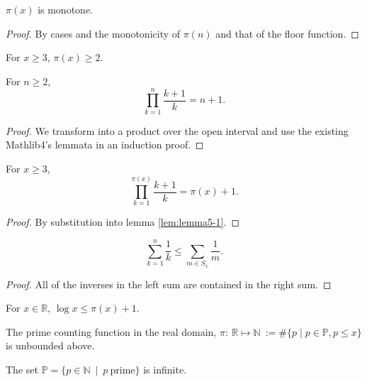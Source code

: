 \begin{lemma}
\label{lem:lemma5-2-1}
\leanok
$\pi(x)$ is monotone.
\end{lemma}
\begin{proof}
\leanok
By cases and the monotonicity of $\pi(n)$ and that of the floor function.
\end{proof}

\begin{lemma}
\label{lem:lemma5-2}
\leanok
For $x\ge3$, $\pi(x)\ge2$.
\end{lemma}

\begin{lemma}
\label{lem:lemma5-1}
\leanok
For $n\ge2$,
    $$\prod_{k=1}^{n}\frac{k+1}{k} = n+1.$$
\end{lemma}
\begin{proof}
\leanok
We transform into a product over the open interval and use the existing Mathlib4's lemmata in an induction proof.
\end{proof}

\begin{lemma}
\label{lem:lemma5}
\leanok
For $x\ge3$,
    $$\prod_{k=1}^{\pi(x)}\frac{k+1}{k} = \pi(x)+1.$$
\end{lemma}
\begin{proof}
\leanok
    By substitution into lemma \ref{lem:lemma5-1}.
\end{proof}


\begin{lemma}
\label{lem:lemma1}
\leanok
{}
    $$\sum_{k=1}^n\frac1k \le \sum_{m\in S_x}\frac{1}{m}. $$
\end{lemma}
\begin{proof}
All of the inverses in the left sum are contained in the right sum.
\end{proof}


\begin{theorem}
\label{thm:log_le_primeCountingReal_add_one}
\leanok
For $x\in\mathbb{R}$, $\log x \le \pi(x) +1$.
\end{theorem}

\begin{theorem}
\label{thm:primeCountingReal_unbounded}
\leanok
The prime counting function in the real domain, $\pi:\ \mathbb{R} \mapsto \mathbb{N} \ := \#\big\{p\mid p \in\mathbb{P}, p\le x \big\}$ is unbounded above.
\end{theorem}

\begin{theorem}
\label{thm:infinite_primes}
\leanok
{}
The set $\mathbb{P} = \big\{p \in \mathbb{N} \ \mid \ p \ \mathrm{prime} \big\}$ is infinite. 
\end{theorem}

